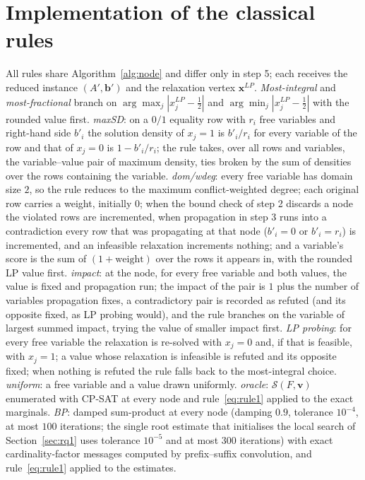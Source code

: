 \documentclass[final,5p,times,twocolumn,authoryear]{elsarticle}
\newcommand{\SOL}{\mathcal{S}}
\begin{document}
\section{Implementation of the classical rules}
\label{app:rules}
All rules share Algorithm~\ref{alg:node} and differ only in step 5; each receives the reduced instance $(A',\mathbf{b}')$ and the relaxation vertex $\mathbf{x}^{LP}$. \emph{Most-integral} and \emph{most-fractional} branch on $\arg\max_j|x^{LP}_j-\frac12|$ and $\arg\min_j|x^{LP}_j-\frac12|$ with the rounded value first. \emph{maxSD}: on a $0/1$ equality row with $r_i$ free variables and right-hand side $b'_i$ the solution density of $x_j=1$ is $b'_i/r_i$ for every variable of the row and that of $x_j=0$ is $1-b'_i/r_i$; the rule takes, over all rows and variables, the variable--value pair of maximum density, ties broken by the sum of densities over the rows containing the variable. \emph{dom/wdeg}: every free variable has domain size $2$, so the rule reduces to the maximum conflict-weighted degree; each original row carries a weight, initially $0$; when the bound check of step 2 discards a node the violated rows are incremented, when propagation in step 3 runs into a contradiction every row that was propagating at that node ($b'_i=0$ or $b'_i=r_i$) is incremented, and an infeasible relaxation increments nothing; and a variable's score is the sum of $(1+\text{weight})$ over the rows it appears in, with the rounded LP value first. \emph{impact}: at the node, for every free variable and both values, the value is fixed and propagation run; the impact of the pair is $1$ plus the number of variables propagation fixes, a contradictory pair is recorded as refuted (and its opposite fixed, as LP probing would), and the rule branches on the variable of largest summed impact, trying the value of smaller impact first. \emph{LP probing}: for every free variable the relaxation is re-solved with $x_j=0$ and, if that is feasible, with $x_j=1$; a value whose relaxation is infeasible is refuted and its opposite fixed; when nothing is refuted the rule falls back to the most-integral choice. \emph{uniform}: a free variable and a value drawn uniformly. \emph{oracle}: $\SOL(F,\mathbf{v})$ enumerated with CP-SAT at every node and rule~\eqref{eq:rule1} applied to the exact marginals. \emph{BP}: damped sum-product at every node (damping $0.9$, tolerance $10^{-4}$, at most $100$ iterations; the single root estimate that initialises the local search of Section~\ref{sec:rq1} uses tolerance $10^{-5}$ and at most $300$ iterations) with exact cardinality-factor messages computed by prefix--suffix convolution, and rule~\eqref{eq:rule1} applied to the estimates.
\end{document}
